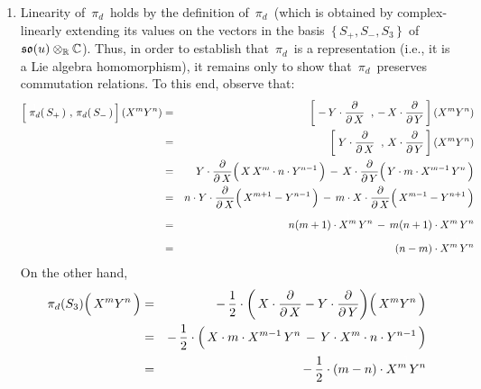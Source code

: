 \begin{enumerate}
\item
	Linearity of \,$\pi_{d}$\, holds by the definition of \,$\pi_{d}$\,
	(which is obtained by complex-linearly extending its values on the vectors in the basis
	\,$\{\,S_{+}, S_{-}, S_{3}\,\}$\, of \,$\mathfrak{so}(u) \otimes_{\mathbb{R}}\mathbb{C}$).
	Thus, in order to establish that \,$\pi_{d}$\, is a representation (i.e., it is a Lie algebra homomorphism),
	it remains only to show that \,$\pi_{d}$\, preserves commutation relations.
	To this end, observe that:
	\begin{eqnarray*}
	\left[\;
		\overset{{\color{white}1}}{\pi_{d}}\!\left(\,S_{+}\,\right)
		\, , \,
		\pi_{d}\!\left(\,S_{-}\,\right)
		\,\right]
		(X^{m}Y^{n})
	& = &
		\left[\;
			-\,Y\cdot\dfrac{\partial}{\partial\,X}
			\;\; , \,
			-\,X\cdot\dfrac{\partial}{\partial\,Y}
			\,\right]
			(X^{m}Y^{n})
	\\
	& = &
		\left[\;
			Y\cdot\dfrac{\partial}{\partial\,X}
			\;\; , \,
			X\cdot\dfrac{\partial}{\partial\,Y}
			\,\right]
			(X^{m}Y^{n})
	\\
	& = &
		Y\cdot\dfrac{\partial}{\partial\,X}\!\left(\,
			\overset{{\color{white}.}}{X}\,X^{m} \cdot n \cdot Y^{n-1}
			\,\right)
		\, - \,
		X\cdot\dfrac{\partial}{\partial\,Y}\!\left(\,
			\overset{{\color{white}.}}{Y} \cdot m \cdot X^{m-1} \, Y^{n}
			\,\right)
	\\
	& = &
		n \cdot Y \cdot \dfrac{\partial}{\partial\,X}\!\left(\,
			\overset{{\color{white}.}}{X^{m+1}} - Y^{n-1}
			\,\right)
		\, - \,
		m \cdot X \cdot \dfrac{\partial}{\partial\,X}\!\left(\,
			\overset{{\color{white}.}}{X^{m-1}} - Y^{n+1}
			\,\right)
	\\
	& = &
		n(m+1) \cdot \overset{{\color{white}1}}{X^{m}}\,Y^{n} \, - \, m(n+1) \cdot X^{m}\,Y^{n}
	\\
	& = &
		(n-m) \cdot \overset{{\color{white}1}}{X^{m}\,Y^{n}}
	\end{eqnarray*}
	On the other hand,
	\begin{eqnarray*}
	\pi_{d}(S_{3})\!\left(\,\overset{{\color{white}.}}{X^{m}Y^{n}}\,\right)
	& = &
		-\,\dfrac{1}{2}\cdot\left(\,X\cdot\dfrac{\partial}{\partial\,X} - Y\cdot\dfrac{\partial}{\partial\,Y}\right)
		\!\left(\,\overset{{\color{white}.}}{X^{m}Y^{n}}\,\right)
	\\
	& = &
		-\,\dfrac{1}{2}\cdot\left(\,
			\overset{{\color{white}.}}{X} \cdot m \cdot X^{m-1}\,Y^{n}
			\, - \,
			Y \cdot X^{m} \cdot n \cdot Y^{n-1}
			\,\right)
	\\
	& = &
		- \, \dfrac{1}{2} \cdot (m-n) \cdot \overset{{\color{white}1}}{X^{m}\,Y^{n}}

\end{eqnarray*}
\end{enumerate}
